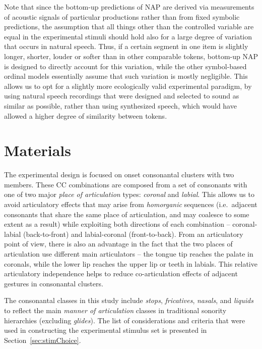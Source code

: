 Note that since the bottom-up predictions of NAP are derived via measurements of acoustic signals of particular productions rather than from fixed symbolic predictions, the assumption that all things other than the controlled variable are equal in the experimental stimuli should hold also for a large degree of variation that occurs in natural speech. Thus, if a certain segment in one item is slightly longer, shorter, louder or softer than in other comparable tokens, bottom-up NAP is designed to directly account for this variation, while the other symbol-based ordinal models essentially assume that such variation is mostly negligible. This allows us to opt for a slightly more ecologically valid experimental paradigm, by using natural speech recordings that were designed and selected to sound as similar as possible, rather than using synthesized speech, which would have allowed a higher degree of similarity between tokens.

\section{Materials}\label{sec:materials}

The experimental design is focused on onset consonantal clusters with two members. These CC combinations are composed from a set of consonants with one of two major \emph{place of articulation} types: \emph{coronal} and \emph{labial}. This allows us to avoid articulatory effects that may arise from \emph{homorganic} sequences (i.e.~adjacent consonants that share the same place of articulation, and may coalesce to some extent as a result) while exploiting both directions of each combination -- coronal-labial (back-to-front) and labial-coronal (front-to-back). From an articulatory point of view, there is also an advantage in the fact that the two places of articulation use different main articulators -- the tongue tip reaches the palate in coronals, while the lower lip reaches the upper lip or teeth in labials. This relative articulatory independence helps to reduce co-articulation effects of adjacent gestures in consonantal clusters.

The consonantal classes in this study include \emph{stops}, \emph{fricatives}, \emph{nasals}, and \emph{liquids} to reflect the main \emph{manner of articulation} classes in traditional sonority hierarchies (excluding \emph{glides}).
The list of considerations and criteria that were used in constructing the experimental stimulus set is presented in Section~\ref{sec:stimChoice}.

